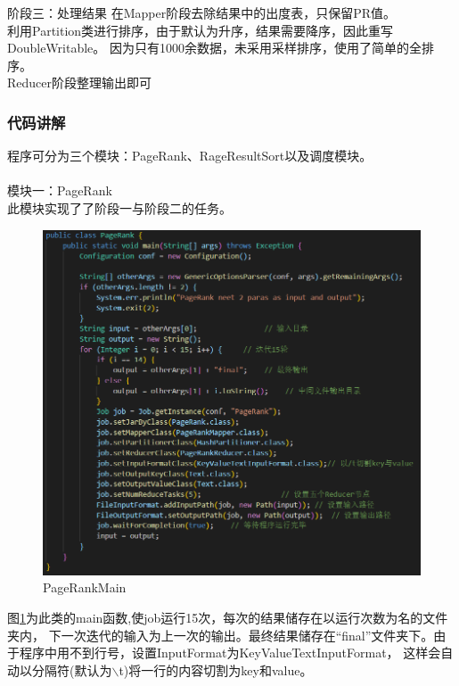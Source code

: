 \documentclass[a4paper,UTF8]{article}
\numberwithin{equation}{section}
\begin{document}
阶段三：处理结果
在Mapper阶段去除结果中的出度表，只保留PR值。\\
利用Partition类进行排序，由于默认为升序，结果需要降序，因此重写DoubleWritable。
因为只有1000余数据，未采用采样排序，使用了简单的全排序。\\
Reducer阶段整理输出即可

\subsubsection{代码讲解}
程序可分为三个模块：PageRank、RageResultSort以及调度模块。\\\\

模块一：PageRank\\
此模块实现了了阶段一与阶段二的任务。
\begin{figure}[H]
    \centering
    \includegraphics[width = 15cm]{PageRankMain.png}
    \caption{PageRankMain}
    \label{PageRankMain}
\end{figure}
图\ref{PageRankMain}为此类的main函数,使job运行15次，每次的结果储存在以运行次数为名的文件夹内，
下一次迭代的输入为上一次的输出。最终结果储存在“final”文件夹下。由于程序中用不到行号，设置InputFormat为KeyValueTextInputFormat，
这样会自动以分隔符(默认为$\backslash$t)将一行的内容切割为key和value。\\
\end{document}
